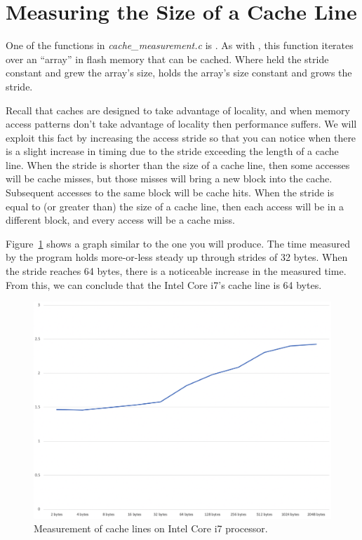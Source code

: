 \section{Measuring the Size of a Cache Line}

One of the functions in \textit{cache\_measurement.c} is .
As with , this function iterates over an ``array'' in flash memory that can be cached.
Where  held the stride constant and grew the array's size,
 holds the array's size constant and grows the stride.

Recall that caches are designed to take advantage of locality, and when memory access patterns don't take advantage of locality then performance suffers.
We will exploit this fact by increasing the access stride so that you can notice when there is a slight increase in timing due to the stride exceeding the length of a cache line.
When the stride is shorter than the size of a cache line, then some accesses will be cache misses, but those misses will bring a new block into the cache.
Subsequent accesses to the same block will be cache hits.
When the stride is equal to (or greater than) the size of a cache line, then each access will be in a different block,
and every access will be a cache miss.

Figure~\ref{fig:LaptopCacheLine} shows a graph similar to the one you will produce.
The time measured by the program holds more-or-less steady up through strides of 32 bytes.
When the stride reaches 64 bytes, there is a noticeable increase in the measured time.
From this, we can conclude that the Intel Core i7's cache line is 64 bytes.

\begin{figure}
    \centering
    \includegraphics[width=13cm]{IntelImages/IntelI7cacheLine}
    \caption{Measurement of cache lines on Intel Core i7 processor. \label{fig:LaptopCacheLine}}
\end{figure}

